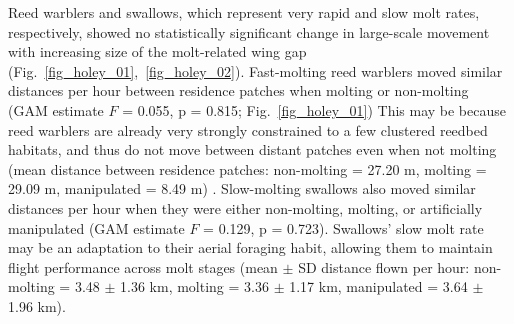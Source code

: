 \begin{refsection}
Reed warblers and swallows, which represent very rapid and slow molt rates, respectively, showed no statistically significant change in large-scale movement with increasing size of the molt-related wing gap (Fig.~\ref{fig_holey_01},~\ref{fig_holey_02}).
Fast-molting reed warblers moved similar distances per hour between residence patches when molting or non-molting (GAM estimate $F$ = 0.055, p = 0.815; Fig.~\ref{fig_holey_01})
This may be because reed warblers are already very strongly constrained to a few clustered reedbed habitats, and thus do not move between distant patches even when not molting (mean distance between residence patches: non-molting = 27.20 m, molting = 29.09 m, manipulated = 8.49 m) \citep{kiat2016}.
Slow-molting swallows also moved similar distances per hour when they were either non-molting, molting, or artificially manipulated (GAM estimate $F$ = 0.129, p = 0.723).
Swallows' slow molt rate may be an adaptation to their aerial foraging habit, allowing them to maintain flight performance across molt stages (mean $\pm$ SD distance flown per hour: non-molting = 3.48 $\pm$ 1.36 km, molting = 3.36 $\pm$ 1.17 km, manipulated = 3.64 $\pm$ 1.96 km).


\end{refsection}
